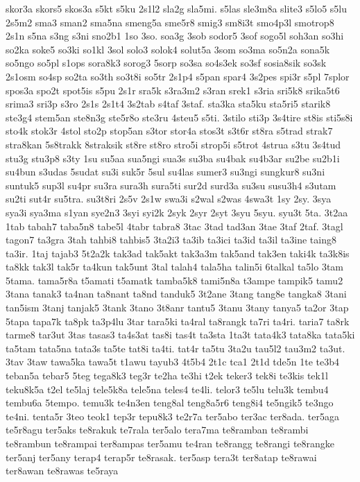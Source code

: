 {skor3a skors5 skos3a s5kt s5ku 2s1l2 sla2g sla5mi. s5las sle3m8a slite3
s5lo5 s5lu 2s5m2 sma3 sman2 sma5na smeng5a sme5r8 smig3 sm8i3t smo4p3l
smotrop8 2s1n s5na s3ng s3ni sno2b1 1so 3so. soa3g 3sob sodor5 3sof sogo5l
soh3an so3hi so2ka soke5 so3ki so1kl 3sol solo3 solok4 solut5a 3som so3ma
so5n2a sona5k so5ngo so5pl s1ops sora8k3 sorog3 5sorp so3sa so4s3ek so3sf
sosia8sik so3sk 2s1osm so4sp so2ta so3th so3t8i so5tr 2s1p4 s5pan spar4
3s2pes spi3r s5pl 7splor spos3a spo2t spot5is s5pu 2s1r sra5k s3ra3m2
s3ran srek1 s3ria sri5k8 srika5t6 srima3 sri3p s3ro 2s1s 2s1t4 3s2tab
s4taf 3staf. sta3ka sta5ku sta5ri5 starik8 ste3g4 stem5an ste8n3g ste5r8o
ste3ru 4steu5 s5ti. 3stilo sti3p 3s4tire st8is sti5s8i sto4k stok3r 4stol
sto2p stop5an s3tor stor4a stos3t s3t6r st8ra s5trad strak7 stra8kan
5s8trakk 8straksik st8re st8ro stro5i strop5i s5trot 4strua s3tu 3s4tud
stu3g stu3p8 s3ty 1su su5aa sua5ngi sua3s su3ba su4bak su4b3ar su2be
su2b1i su4bun s3udas 5sudat su3i suk5r 5sul su4las sumer3 su3ngi sungkur8
su3ni suntuk5 sup3l su4pr su3ra sura3h sura5ti sur2d surd3a su3su susu3h4
s3utam su2ti sut4r su5tra. su3t8ri 2s5v 2s1w swa3i s2wal s2was 4swa3t 1sy
2sy. 3sya sya3i sya3ma s1yan sye2n3 3syi syi2k 2syk 2syr 2syt 3syu 5syu.
syu3t 5ta. 3t2aa 1tab tabah7 taba5n8 tabe5l 4tabr tabra8 3tac 3tad tad3an
3tae 3taf 2taf. 3tagl tagon7 ta3gra 3tah tahbi8 tahbis5 3ta2i3 ta3ib
ta3ici ta3id ta3il ta3ine taing8 ta3ir. 1taj tajab3 5t2a2k tak3ad tak5akt
tak3a3m tak5and tak3en taki4k ta3k8is ta8kk tak3l tak5r ta4kun tak5unt
3tal talah4 tala5ha talin5i 6talkal ta5lo 3tam 5tama. tama5r8a t5amati
t5amatk tamba5k8 tami5n8a t3ampe tampik5 tamu2 3tana tanak3 ta4nan ta8nant
ta8nd tanduk5 3t2ane 3tang tang8e tangka8 3tani tan5ism 3tanj tanjak5
3tank 3tano 3t8anr tantu5 3tanu 3tany tanya5 ta2or 3tap 5tapa tapa7k ta8pk
ta3p4lu 3tar tara5ki ta4ral ta8rangk ta7ri ta4ri. taria7 ta8rk tarme8
tar3ut 3tas tasas3 ta4s3at tas8i tas4t ta3sta 1ta3t tata4k3 tata8ka
tata5ki ta5tam tata5na tata3s ta5te tat8i ta4ti. tat4r ta5tu 3ta2u tau5l2
tau3m2 ta3ut. 3tav 3taw tawa5ka tawa5t t1awu tayub3 4t5b4 2t1c tca1 2t1d
tde5n 1te te3b4 teban5a tebar5 5teg tega8k3 teg3r te2ha te3hi t2ek teker3
tek8i te3kis tek1l teku8k5a t2el te5laj tele5k8a tele5na teles4 te4li.
telor3 te5lu telu3k tembu4 tembu6a 5tempo. temu3k te4n3en teng8al
teng8a5r6 teng8i4 te5ngik5 te3ngo te4ni. tenta5r 3teo teok1 tep3r tepu8k3
te2r7a ter5abo ter3ac ter8ada. ter5aga te5r8agu ter5aks te8rakuk te7rala
ter5alo tera7ma te8ramban te8rambi te8rambun te8rampai ter8ampas ter5amu
te4ran te8rangg te8rangi te8rangke ter5anj ter5any terap4 terap5r
te8rasak. ter5asp tera3t ter8atap te8rawai ter8awan te8rawas te5raya
}
